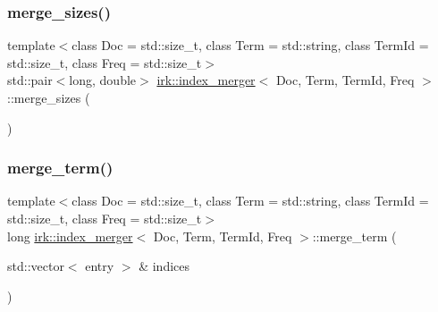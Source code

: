 \mbox{\label{classirk_1_1index__merger_a215f38c50ba34e627ae54ec4f5caf52a}} 
\subsubsection{\texorpdfstring{merge\+\_\+sizes()}{merge\_sizes()}}
{\footnotesize\ttfamily template$<$class Doc = std\+::size\+\_\+t, class Term = std\+::string, class Term\+Id = std\+::size\+\_\+t, class Freq = std\+::size\+\_\+t$>$ \\
std\+::pair$<$long, double$>$ \mbox{\hyperlink{classirk_1_1index__merger}{irk\+::index\+\_\+merger}}$<$ Doc, Term, Term\+Id, Freq $>$\+::merge\+\_\+sizes (\begin{DoxyParamCaption}{ }\end{DoxyParamCaption})\hspace{0.3cm}{\ttfamily [inline]}}

\mbox{\label{classirk_1_1index__merger_a83813154e14e7f558e93b657695de11a}} 
\subsubsection{\texorpdfstring{merge\+\_\+term()}{merge\_term()}}
{\footnotesize\ttfamily template$<$class Doc = std\+::size\+\_\+t, class Term = std\+::string, class Term\+Id = std\+::size\+\_\+t, class Freq = std\+::size\+\_\+t$>$ \\
long \mbox{\hyperlink{classirk_1_1index__merger}{irk\+::index\+\_\+merger}}$<$ Doc, Term, Term\+Id, Freq $>$\+::merge\+\_\+term (\begin{DoxyParamCaption}\item[{std\+::vector$<$ entry $>$ \&}]{indices }\end{DoxyParamCaption})\hspace{0.3cm}{\ttfamily [inline]}}

\mbox{\label{classirk_1_1index__merger_a7ad47aefaad1a6f1d04ba904a672c0e5}} 
